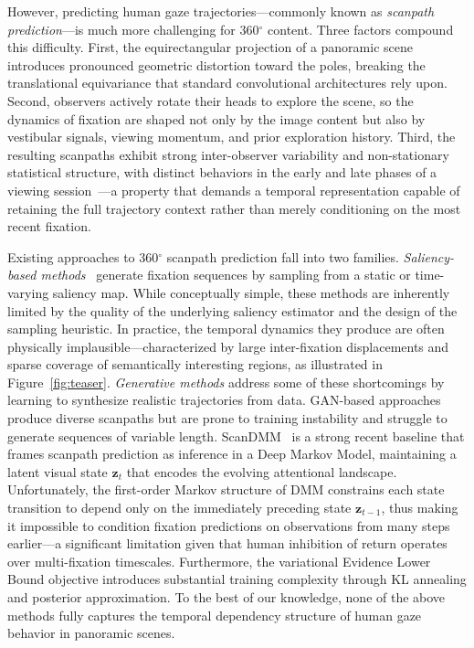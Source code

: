 \documentclass[sigconf]{acmart}
\begin{document}
However, predicting human gaze trajectories—commonly known as \emph{scanpath prediction}—is much more challenging for 360$^\circ$ content. Three factors compound this difficulty. First, the equirectangular projection of a panoramic scene introduces pronounced geometric distortion toward the poles, breaking the translational equivariance that standard convolutional architectures rely upon. Second, observers actively rotate their heads to explore the scene, so the dynamics of fixation are shaped not only by the image content but also by vestibular signals, viewing momentum, and prior exploration history. Third, the resulting scanpaths exhibit strong inter-observer variability and non-stationary statistical structure, with distinct behaviors in the early and late phases of a viewing session~\cite{unema2005time,castelhano2009viewing}—a property that demands a temporal representation capable of retaining the full trajectory context rather than merely conditioning on the most recent fixation.

Existing approaches to 360$^\circ$ scanpath prediction fall into two families. \emph{Saliency-based methods}~\cite{assens2017saltinet,lebreton2018gbvs360} generate fixation sequences by sampling from a static or time-varying saliency map. While conceptually simple, these methods are inherently limited by the quality of the underlying saliency estimator and the design of the sampling heuristic. In practice, the temporal dynamics they produce are often physically implausible—characterized by large inter-fixation displacements and sparse coverage of semantically interesting regions, as illustrated in Figure~\ref{fig:teaser}. \emph{Generative methods} address some of these shortcomings by learning to synthesize realistic trajectories from data. GAN-based approaches~\cite{martin2022scangan} produce diverse scanpaths but are prone to training instability and struggle to generate sequences of variable length. ScanDMM~\cite{sui2023scandmm} is a strong recent baseline that frames scanpath prediction as inference in a Deep Markov Model, maintaining a latent visual state $\mathbf{z}_t$ that encodes the evolving attentional landscape. Unfortunately, the first-order Markov structure of DMM constrains each state transition to depend only on the immediately preceding state $\mathbf{z}_{t-1}$, thus making it impossible to condition fixation predictions on observations from many steps earlier—a significant limitation given that human inhibition of return operates over multi-fixation timescales. Furthermore, the variational Evidence Lower Bound objective introduces substantial training complexity through KL annealing and posterior approximation. To the best of our knowledge, none of the above methods fully captures the temporal dependency structure of human gaze behavior in panoramic scenes.
\end{document}
